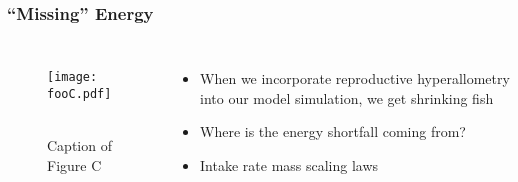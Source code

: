\documentclass[handout]{beamer}
\begin{document}
\begin{frame}
	\frametitle{``Missing'' Energy}
	\begin{columns}[]
			\centering
			\begin{figure}
				\texttt{[image: fooC.pdf]} \
				\caption{Caption of Figure C}
			\end{figure}
			\begin{itemize}
				\item When we incorporate reproductive hyperallometry into our model simulation, we get shrinking fish
				\item Where is the energy shortfall coming from?
				\item Intake rate mass scaling laws
			\end{itemize}			
	\end{columns}
\end{frame}
\end{document}

